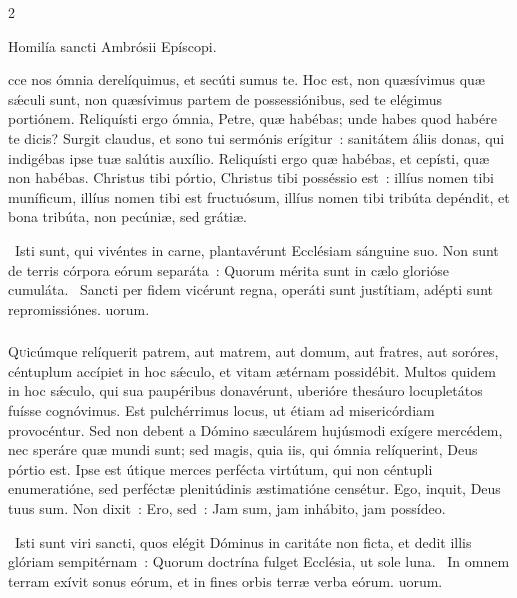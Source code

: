 \documentclass[9pt,twoside]{extarticle}
\begin{document}
\begin{multicols}{2}
{\begin{center}Homilía sancti Ambrósii Epíscopi.\\
\end{center}
cce nos ómnia derelíquimus, et secúti sumus te. Hoc est, non quæsívimus quæ sǽculi sunt, non quæsívimus partem de possessiónibus, sed te elégimus portiónem. Reliquísti ergo ómnia, Petre, quæ habébas; unde habes quod habére te dicis? Surgit claudus, et sono tui sermónis erígitur~: sanitátem áliis donas, qui indigébas ipse tuæ salútis auxílio. Reliquísti ergo quæ habébas, et cepísti, quæ non habébas. Christus tibi pórtio, Christus tibi posséssio est~: illíus nomen tibi muníficum, illíus nomen tibi est fructuósum, illíus nomen tibi tribúta depéndit, et bona tribúta, non pecúniæ, sed grátiæ.

\begin{tightlist}{}
\item {}~Isti sunt, qui vivéntes in carne, plantavérunt Ecclésiam sánguine suo. Non sunt de terris córpora eórum separáta~: \textred{*} Quorum mérita sunt in cælo glorióse cumuláta. ~Sancti per fidem vicérunt regna, operáti sunt justítiam, adépti sunt repromissiónes. uorum.
\end{tightlist}

\subsubsection*{\center {}}
\lettrine{Q}uicúmque relíquerit patrem, aut matrem, aut domum, aut fratres, aut soróres, céntuplum accípiet in hoc sǽculo, et vitam ætérnam possidébit. Multos quidem in hoc sǽculo, qui sua paupéribus donavérunt, uberióre thesáuro locupletátos fuísse cognóvimus. Est pulchérrimus locus, ut étiam ad misericórdiam provocéntur. Sed non debent a Dómino sæculárem hujúsmodi exígere mercédem, nec speráre quæ mundi sunt; sed magis, quia iis, qui ómnia relíquerint, Deus pórtio est. Ipse est útique merces perfécta virtútum, qui non céntupli enumeratióne, sed perféctæ plenitúdinis æstimatióne censétur. Ego, inquit, Deus tuus sum. Non dixit~: Ero, sed~: Jam sum, jam inhábito, jam possídeo.

\begin{tightlist}{}
\item {}~Isti sunt viri sancti, quos elégit Dóminus in caritáte non ficta, et dedit illis glóriam sempitérnam~: \textred{*} Quorum doctrína fulget Ecclésia, ut sole luna. ~In omnem terram exívit sonus eórum, et in fines orbis terræ verba eórum. uorum.
\end{tightlist}

}
\end{multicols}
\end{document}
